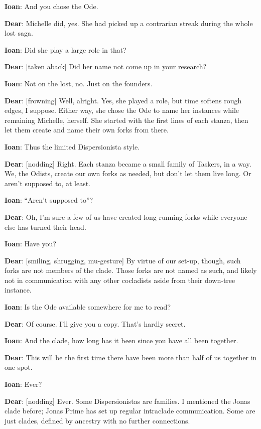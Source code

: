 \textbf{Ioan}: And you chose the Ode.

\textbf{Dear}: Michelle did, yes. She had picked up a contrarian streak during the whole lost saga.

\textbf{Ioan}: Did she play a large role in that?

\textbf{Dear}: {[}taken aback{]} Did her name not come up in your research?

\textbf{Ioan}: Not on the lost, no. Just on the founders.

\textbf{Dear}: {[}frowning{]} Well, alright. Yes, she played a role, but time softens rough edges, I suppose. Either way, she chose the Ode to name her instances while remaining Michelle, herself. She started with the first lines of each stanza, then let them create and name their own forks from there.

\textbf{Ioan}: Thus the limited Dispersionista style.

\textbf{Dear}: {[}nodding{]} Right. Each stanza became a small family of Taskers, in a way. We, the Odists, create our own forks as needed, but don't let them live long. Or aren't supposed to, at least.

\textbf{Ioan}: ``Aren't supposed to''?

\textbf{Dear}: Oh, I'm sure a few of us have created long-running forks while everyone else has turned their head.

\textbf{Ioan}: Have you?

\textbf{Dear}: {[}smiling, shrugging, mu-gesture{]} By virtue of our set-up, though, such forks are not members of the clade. Those forks are not named as such, and likely not in communication with any other cocladists aside from their down-tree instance.

\textbf{Ioan}: Is the Ode available somewhere for me to read?

\textbf{Dear}: Of course. I'll give you a copy. That's hardly secret.

\textbf{Ioan}: And the clade, how long has it been since you have all been together.

\textbf{Dear}: This will be the first time there have been more than half of us together in one spot.

\textbf{Ioan}: Ever?

\textbf{Dear}: {[}nodding{]} Ever. Some Dispersionistas are families. I mentioned the Jonas clade before; Jonas Prime has set up regular intraclade communication. Some are just clades, defined by ancestry with no further connections.

